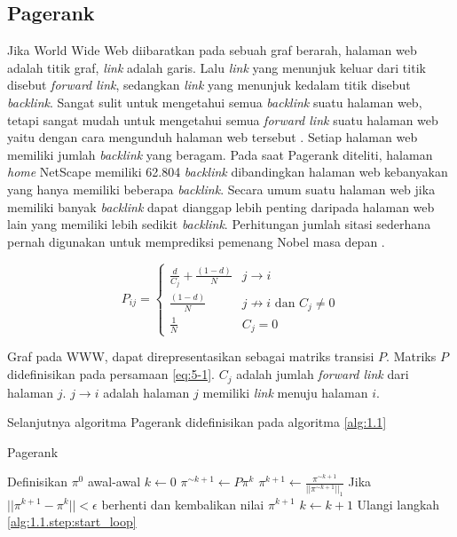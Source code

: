 \documentclass[
	a4paper, %
	12pt, %
	unnumberedsections, %
	twoside, %
]{LTJournalArticle}
\begin{document}
\subsection{Pagerank}

Jika World Wide Web diibaratkan pada sebuah graf berarah, halaman web adalah titik graf, \textit{link} adalah garis. Lalu \textit{link} yang menunjuk keluar dari titik disebut \textit{forward link}, sedangkan \textit{link} yang menunjuk kedalam titik disebut \textit{backlink}. Sangat sulit untuk mengetahui semua \textit{backlink} suatu halaman web, tetapi sangat mudah untuk mengetahui semua \textit{forward link} suatu halaman web yaitu dengan cara mengunduh halaman web tersebut \citep{ilprints422}. Setiap halaman web memiliki jumlah \textit{backlink} yang beragam. Pada saat Pagerank diteliti, halaman \textit{home} NetScape memiliki 62.804 \textit{backlink} dibandingkan halaman web kebanyakan yang hanya memiliki beberapa \textit{backlink}. Secara umum suatu halaman web jika memiliki banyak \textit{backlink} dapat dianggap lebih penting daripada halaman web lain yang memiliki lebih sedikit \textit{backlink}. Perhitungan jumlah sitasi sederhana pernah digunakan untuk memprediksi pemenang Nobel masa depan \citep{ilprints422}. 

\begin{equation}
	\label{eq:5-1}
	P_{ij}= 
	\begin{cases}
		\frac{d}{C_j} + \frac{(1-d)}{N} & j \to i \\
		\frac{(1-d)}{N} & j \not\to i \text{ dan } C_j \not=0 \\
		\frac{1}{N} & C_j = 0
	\end{cases}
\end{equation}

Graf pada WWW, dapat direpresentasikan sebagai matriks transisi $P$. Matriks $P$ didefinisikan pada persamaan \ref{eq:5-1}. $C_j$ adalah jumlah \textit{forward link} dari halaman $j$. $j \to i$ adalah halaman $j$ memiliki \textit{link} menuju halaman $i$.

Selanjutnya algoritma Pagerank didefinisikan pada algoritma \ref{alg:1.1}

\begin{algorithm}
	\caption{Pagerank \citep{zhuetal2005distributedPagerank}}
	\label{alg:1.1}
	\begin{algorithmic}[1]
		\State Definisikan $\pi^0$ awal-awal
		\State $k \gets 0$
		\State \label{alg:1.1.step:start_loop} $\pi^{\sim k+1} \gets P \pi^k$
		\State $\pi^{k+1} \gets \frac{\pi^{\sim k+1}}{||\pi^{\sim k+1}||_1}$
		\State Jika $||\pi^{k+1} - \pi^k|| < \epsilon$  berhenti dan kembalikan nilai $\pi^{k+1}$
		\State $k \gets k+1$
		\State Ulangi langkah \ref{alg:1.1.step:start_loop}
	\end{algorithmic}
\end{algorithm}
\end{document}
